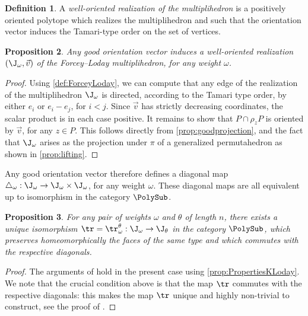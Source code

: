\documentclass[JEP,XML,SOM,NoFloatCountersInSection,Unicode,published]{cedram}
\theoremstyle{definition}
\newtheorem{definition}{Definition}[section]
\theoremstyle{plain}
\newtheorem{proposition}[definition]{Proposition}
\begin{document}
\label{sec:diagonal}

\begin{definition}
A \emph{well-oriented realization of the multiplihedron} is a positively oriented polytope which realizes the multiplihedron and such that the orientation vector induces the Tamari-type order on the set of vertices.
\end{definition}

\begin{proposition}
\label{prop:OrientationVector}
Any good orientation vector induces a well-oriented realization $\left(\J_\omega, \vec v \right)$ of the Forcey--Loday multiplihedron, for any weight $\omega$.
\end{proposition}

\begin{proof}
Using \cref{def:ForceyLoday}, we can compute that any edge of the realization of the multiplihedron $\J_\omega$ is directed, according to the Tamari type order, by either $ e_i$ or $ e_i- e_j$, for $i<j$.
Since $\vec v$ has strictly decreasing coordinates, the scalar product is in each case positive.
It remains to show that $P\cap\rho_z P$ is oriented by $\vec v$, for any $z \in P$.
This follows directly from \cref{prop:goodprojection}, and the fact that $\J_\omega$ arises as the projection under $\pi$ of a generalized permutahedron as shown in \cref{prop:lifting}.
\end{proof}

Any good orientation vector therefore defines a diagonal map $\triangle_\omega : \J_\omega\to \J_\omega \times \J_\omega$, for any weight $\omega$.
These diagonal maps are all equivalent up to isomorphism in the category $\PolySub$.\enlargethispage{.5\baselineskip}

\begin{proposition}
\label{prop:transitionmap}
For any pair of weights $\omega$ and $\theta$ of length $n$, there exists a unique isomorphism
$\tr=\tr_\omega^\theta : \J_\omega \to \J_\theta$ in the category $\PolySub$,
which preserves homeomorphically the faces of the same type and which commutes with the respective diagonals.
\end{proposition}

\begin{proof}
The arguments of \cite[\S\S 3.1--3.2]{MTTV19} hold in the present case using \cref{prop:PropertiesKLoday}.
We note that the crucial condition above is that the map $\tr$ commutes with the respective diagonals: this makes the map $\tr$ unique and highly non-trivial to construct, see the proof of \cite[Prop.\,7]{MTTV19}.
\end{proof}
\end{document}
